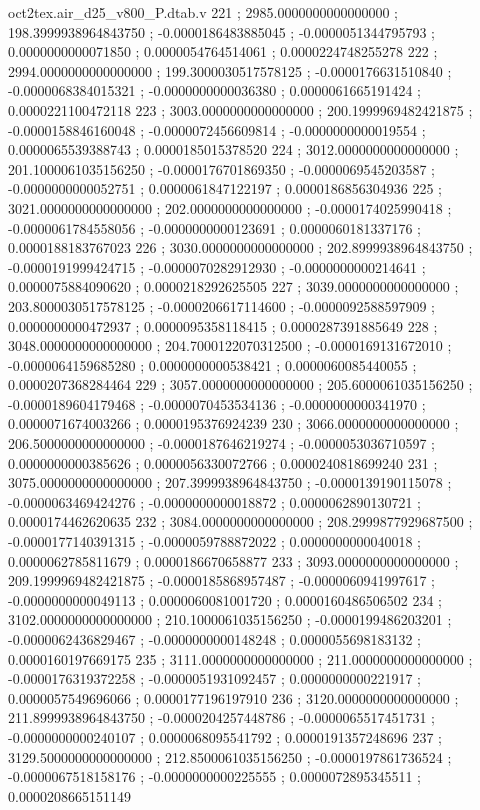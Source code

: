 \begin{filecontents}[overwrite]{oct2tex.air_d25_v800_P.dtab.v}
221 ; 2985.0000000000000000 ; 198.3999938964843750 ; -0.0000186483885045 ; -0.0000051344795793 ; 0.0000000000071850 ; 0.0000054764514061 ; 0.0000224748255278
222 ; 2994.0000000000000000 ; 199.3000030517578125 ; -0.0000176631510840 ; -0.0000068384015321 ; -0.0000000000036380 ; 0.0000061665191424 ; 0.0000221100472118
223 ; 3003.0000000000000000 ; 200.1999969482421875 ; -0.0000158846160048 ; -0.0000072456609814 ; -0.0000000000019554 ; 0.0000065539388743 ; 0.0000185015378520
224 ; 3012.0000000000000000 ; 201.1000061035156250 ; -0.0000176701869350 ; -0.0000069545203587 ; -0.0000000000052751 ; 0.0000061847122197 ; 0.0000186856304936
225 ; 3021.0000000000000000 ; 202.0000000000000000 ; -0.0000174025990418 ; -0.0000061784558056 ; -0.0000000000123691 ; 0.0000060181337176 ; 0.0000188183767023
226 ; 3030.0000000000000000 ; 202.8999938964843750 ; -0.0000191999424715 ; -0.0000070282912930 ; -0.0000000000214641 ; 0.0000075884090620 ; 0.0000218292625505
227 ; 3039.0000000000000000 ; 203.8000030517578125 ; -0.0000206617114600 ; -0.0000092588597909 ; 0.0000000000472937 ; 0.0000095358118415 ; 0.0000287391885649
228 ; 3048.0000000000000000 ; 204.7000122070312500 ; -0.0000169131672010 ; -0.0000064159685280 ; 0.0000000000538421 ; 0.0000060085440055 ; 0.0000207368284464
229 ; 3057.0000000000000000 ; 205.6000061035156250 ; -0.0000189604179468 ; -0.0000070453534136 ; -0.0000000000341970 ; 0.0000071674003266 ; 0.0000195376924239
230 ; 3066.0000000000000000 ; 206.5000000000000000 ; -0.0000187646219274 ; -0.0000053036710597 ; 0.0000000000385626 ; 0.0000056330072766 ; 0.0000240818699240
231 ; 3075.0000000000000000 ; 207.3999938964843750 ; -0.0000139190115078 ; -0.0000063469424276 ; -0.0000000000018872 ; 0.0000062890130721 ; 0.0000174462620635
232 ; 3084.0000000000000000 ; 208.2999877929687500 ; -0.0000177140391315 ; -0.0000059788872022 ; 0.0000000000040018 ; 0.0000062785811679 ; 0.0000186670658877
233 ; 3093.0000000000000000 ; 209.1999969482421875 ; -0.0000185868957487 ; -0.0000060941997617 ; -0.0000000000049113 ; 0.0000060081001720 ; 0.0000160486506502
234 ; 3102.0000000000000000 ; 210.1000061035156250 ; -0.0000199486203201 ; -0.0000062436829467 ; -0.0000000000148248 ; 0.0000055698183132 ; 0.0000160197669175
235 ; 3111.0000000000000000 ; 211.0000000000000000 ; -0.0000176319372258 ; -0.0000051931092457 ; 0.0000000000221917 ; 0.0000057549696066 ; 0.0000177196197910
236 ; 3120.0000000000000000 ; 211.8999938964843750 ; -0.0000204257448786 ; -0.0000065517451731 ; -0.0000000000240107 ; 0.0000068095541792 ; 0.0000191357248696
237 ; 3129.5000000000000000 ; 212.8500061035156250 ; -0.0000197861736524 ; -0.0000067518158176 ; -0.0000000000225555 ; 0.0000072895345511 ; 0.0000208665151149

\end{filecontents}
